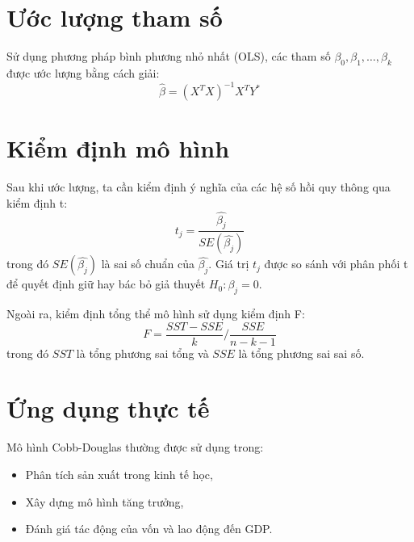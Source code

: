 \section{Ước lượng tham số}
Sử dụng phương pháp bình phương nhỏ nhất (OLS), các tham số $\beta_0, \beta_1, \dots, \beta_k$ được ước lượng bằng cách giải:
\begin{equation}
    \hat{\beta} = (X^T X)^{-1} X^T Y^*
\end{equation}

\section{Kiểm định mô hình}
Sau khi ước lượng, ta cần kiểm định ý nghĩa của các hệ số hồi quy thông qua kiểm định t:
\begin{equation}
    t_j = \frac{\hat{\beta_j}}{SE(\hat{\beta_j})}
\end{equation}
trong đó $SE(\hat{\beta_j})$ là sai số chuẩn của $\hat{\beta_j}$. Giá trị $t_j$ được so sánh với phân phối t để quyết định giữ hay bác bỏ giả thuyết $H_0: \beta_j = 0$.

Ngoài ra, kiểm định tổng thể mô hình sử dụng kiểm định F:
\begin{equation}
    F = \frac{SST - SSE}{k} \Big/ \frac{SSE}{n-k-1}
\end{equation}
trong đó $SST$ là tổng phương sai tổng và $SSE$ là tổng phương sai sai số.

\section{Ứng dụng thực tế}
Mô hình Cobb-Douglas thường được sử dụng trong:
\begin{itemize}
    \item Phân tích sản xuất trong kinh tế học,
    \item Xây dựng mô hình tăng trưởng,
    \item Đánh giá tác động của vốn và lao động đến GDP.
\end{itemize}